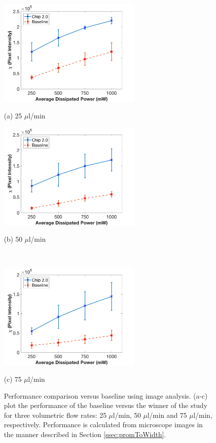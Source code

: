 \begin{figure}[H]
  \begin{minipage}[t]{0.49\linewidth}\centering
    \includegraphics[width=7cm]{ErrorBars25ul}
    \medskip
    \centerline{(a) 25 $\mu$l/min}
  \end{minipage}\hfill
  \begin{minipage}[t]{0.49\linewidth}\centering
    \includegraphics[width=7cm]{ErrorBars50ul}
    \medskip
    \centerline{(b) 50 $\mu$l/min}\\
  \end{minipage}
  \begin{minipage}[t]{0.99\linewidth}\centering
    \includegraphics[width=7cm]{ErrorBars75ul}
    \medskip
    \centerline{(c) 75 $\mu$l/min}
  \end{minipage}
  \caption[Performance Comparison Versus Baseline using Image Analysis]{Performance comparison versus baseline using image analysis. (a-c) plot the performance of the baseline versus the winner of the study for three volumetric flow rates: 25 $\mu$l/min, 50 $\mu$l/min and 75 $\mu$l/min, respectively. Performance is calculated from microscope images in the manner described in Section \ref{ssec:promToWidth}.}
	\label{fig:headToHeadImages}
\end{figure}


